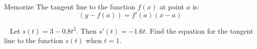 \begin{frame}
\begin{block}{Memorize}
The tangent line to the function $f(x)$ at point $a$ is:
\[(y-f(a))=f'(a)(x-a)\]
\end{block}
\end{frame}
\begin{frame}[t]\AnswerSpace
{}
\NowYou~
Let $s(t)=3-0.8t^2$. Then $s'(t)=-1.6t$.
Find the equation for the tangent line to the function $s(t)$ when $t=1$.\pause\color{answercolor}
\end{frame}

